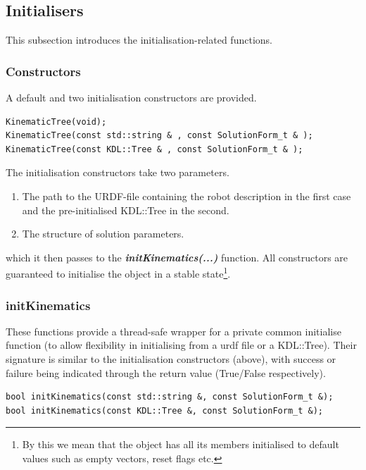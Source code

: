 \documentclass[12pt,a4paper,onecolumn]{article}
\begin{document}
\subsection{Initialisers}
This subsection introduces the initialisation-related functions.

\subsubsection*{Constructors}
A default and two initialisation constructors are provided.
\begin{lstlisting}
KinematicTree(void);
KinematicTree(const std::string & , const SolutionForm_t & );
KinematicTree(const KDL::Tree & , const SolutionForm_t & );
\end{lstlisting}
The initialisation constructors take two parameters.
\begin{enumerate}
\item The path to the URDF-file containing the robot description in the first case and the pre-initialised KDL::Tree in the second.
\item The structure of solution parameters.
\end{enumerate}
which it then passes to the \textbf{\textit{initKinematics(...)}} function. All constructors are guaranteed to initialise the object in a stable state\footnote{By this we mean that the object has all its members initialised to default values such as empty vectors, reset flags etc.}.

\subsubsection*{initKinematics}
These functions provide a thread-safe wrapper for a private common initialise function (to allow flexibility in initialising from a urdf file or a KDL::Tree). Their signature is similar to the initialisation constructors (above), with success or failure being indicated through the return value (True/False respectively).
\begin{lstlisting}
bool initKinematics(const std::string &, const SolutionForm_t &);
bool initKinematics(const KDL::Tree &, const SolutionForm_t &);
\end{lstlisting}
\end{document}
